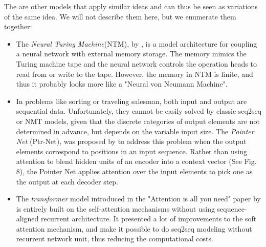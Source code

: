The are other models that apply similar ideas and can thus be seen as variations of the same idea. We will not describe them here, but we enumerate them together:

\begin{itemize}
    \item The \textit{Neural Turing Machine}(NTM), by \citet{Graves2014}, is a model architecture for coupling a neural network with external memory storage. The memory mimics the Turing machine tape and the neural network controls the operation heads to read from or write to the tape. However, the memory in NTM is finite, and thus it probably looks more like a "Neural von Neumann Machine".
    \item In problems like sorting or traveling salesman, both input and output are sequential data. Unfortunately, they cannot be easily solved by classic seq2seq or NMT models, given that the discrete categories of output elements are not determined in advance, but depends on the variable input size. The \textit{Pointer Net} (Ptr-Net), was proposed by \citet{Vinyals2015} to address this problem when the output elements correspond to positions in an input sequence. Rather than using attention to blend hidden units of an encoder into a context vector (See Fig. 8), the Pointer Net applies attention over the input elements to pick one as the output at each decoder step.
    \item The \textit{transformer} model introduced in the "Attention is all you need" paper by \citet{Vaswani2017} is entirely built on the self-attention mechanisms without using sequence-aligned recurrent architecture. It presented a lot of improvements to the soft attention mechanism, and make it possible to do seq2seq modeling without recurrent network unit, thus reducing the computational costs.
\end{itemize}



